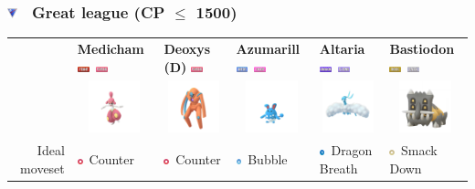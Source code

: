 \documentclass[8pt,aspectratio=169,compress]{beamer}
\renewcommand{\baselinestretch}{1.1}
\newcommand{\fightingfull}{\includegraphics[height=0.15cm]{../../images/type/full/Fighting.png}}
\newcommand{\fairyfull}{\includegraphics[height=0.15cm]{../../images/type/full/Fairy.png}}
\newcommand{\flyingfull}{\includegraphics[height=0.15cm]{../../images/type/full/Flying.png}}
\newcommand{\dragonfull}{\includegraphics[height=0.15cm]{../../images/type/full/Dragon.png}}
\newcommand{\psychicfull}{\includegraphics[height=0.15cm]{../../images/type/full/Psychic.png}}
\newcommand{\rockfull}{\includegraphics[height=0.15cm]{../../images/type/full/Rock.png}}
\newcommand{\waterfull}{\includegraphics[height=0.15cm]{../../images/type/full/Water.png}}
\newcommand{\steelfull}{\includegraphics[height=0.15cm]{../../images/type/full/Steel.png}}
\newcommand{\fightingsimp}{\includegraphics[height=0.15cm]{../../images/type/simplified/fighting.png}}
\newcommand{\dragonsimp}{\includegraphics[height=0.15cm]{../../images/type/simplified/dragon.png}}
\newcommand{\rocksimp}{\includegraphics[height=0.15cm]{../../images/type/simplified/rock.png}}
\newcommand{\watersimp}{\includegraphics[height=0.15cm]{../../images/type/simplified/water.png}}
\begin{document}
\renewcommand{\baselinestretch}{1.1}

\begin{frame}
\frametitle{\includegraphics[width=0.3cm]{../../images/league/great_league.png} ~Great league (CP $\leq$ 1500)}

\begin{tiny}
\begin{block}{}
\begin{center}

\begin{tabular}{rp{2cm}p{2cm}p{2cm}p{2cm}p{2cm}} 
  & \textbf{Medicham} \hfill \fightingfull~\psychicfull& \textbf{Deoxys (D)} \hfill \psychicfull & \textbf{Azumarill} \hfill\waterfull~\fairyfull &\textbf{Altaria} \hfill\dragonfull~\flyingfull &\textbf{Bastiodon} \hfill\rockfull~\steelfull  \\ 
  & \multicolumn{1}{c}{\includegraphics[width=1.5cm]{../../images/pokemon/medicham}} &  \multicolumn{1}{c}{\includegraphics[width=1.5cm]{../../images/pokemon/deoxys_d} } & \multicolumn{1}{c}{\includegraphics[width=1.5cm]{../../images/pokemon/azumarill} } & \multicolumn{1}{c}{\includegraphics[width=1.5cm]{../../images/pokemon/altaria} } & \multicolumn{1}{c}{\includegraphics[width=1.5cm]{../../images/pokemon/bastiodon} }  \\ \hline 
   \multirow{3}{*}{Ideal moveset}  & \fightingsimp~Counter & \fightingsimp~Counter & \watersimp~Bubble & \dragonsimp~Dragon Breath & \rocksimp~Smack Down \\

\end{tabular}
\end{center}
\end{block}
\end{tiny}
\end{frame}
\end{document}
